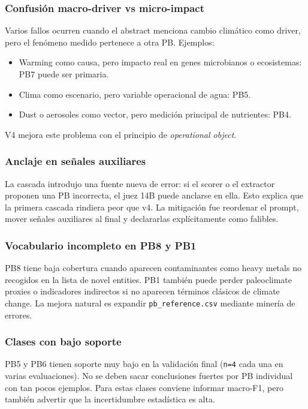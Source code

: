 \subsubsection{Confusión macro-driver vs micro-impact}

Varios fallos ocurren cuando el abstract menciona cambio climático como driver, pero el fenómeno medido pertenece a otra PB. Ejemplos:

\begin{itemize}
\item Warming como causa, pero impacto real en genes microbianos o ecosistemas: PB7 puede ser primaria.
\item Clima como escenario, pero variable operacional de agua: PB5.
\item Dust o aerosoles como vector, pero medición principal de nutrientes: PB4.
\end{itemize}

V4 mejora este problema con el principio de \emph{operational object}.

\subsubsection{Anclaje en señales auxiliares}

La cascada introdujo una fuente nueva de error: si el scorer o el extractor proponen una PB incorrecta, el juez 14B puede anclarse en ella. Esto explica que la primera cascada rindiera peor que v4. La mitigación fue reordenar el prompt, mover señales auxiliares al final y declararlas explícitamente como falibles.

\subsubsection{Vocabulario incompleto en PB8 y PB1}

PB8 tiene baja cobertura cuando aparecen contaminantes como heavy metals no recogidos en la lista de novel entities. PB1 también puede perder paleoclimate proxies o indicadores indirectos si no aparecen términos clásicos de climate change. La mejora natural es expandir \texttt{pb\_reference.csv} mediante minería de errores.

\subsubsection{Clases con bajo soporte}

PB5 y PB6 tienen soporte muy bajo en la validación final (\texttt{n=4} cada una en varias evaluaciones). No se deben sacar conclusiones fuertes por PB individual con tan pocos ejemplos. Para estas clases conviene informar macro-F1, pero también advertir que la incertidumbre estadística es alta.

